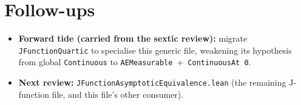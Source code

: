 \documentclass[11pt]{article}
\begin{document}
\section{Follow-ups}
\begin{itemize}[noitemsep]
  \item \textbf{Forward tide (carried from the sextic review):} migrate \texttt{JFunctionQuartic} to specialise
    this generic file, weakening its hypothesis from global \texttt{Continuous} to
    \texttt{AEMeasurable}~$+$~\texttt{ContinuousAt 0}.
  \item \textbf{Next review:} \texttt{JFunctionAsymptoticEquivalence.lean} (the remaining J-function file, and
    this file's other consumer).
\end{itemize}
\end{document}
